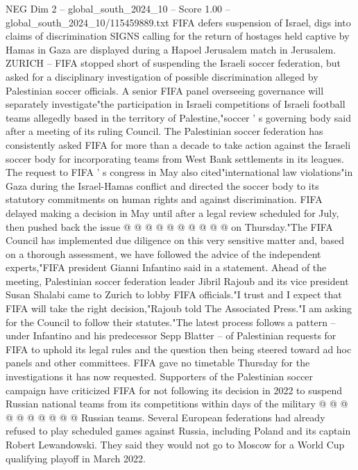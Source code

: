 \begin{textsample}{NEG Dim 2 – global\_south\_2024\_10 – Score 1.00 – global\_south\_2024\_10/115459889.txt}  \label{ex:f2_neg_418}
FIFA defers suspension of Israel, digs into claims of discrimination SIGNS calling for the return of hostages held captive by Hamas in Gaza are displayed during a Hapoel Jerusalem match in Jerusalem.
ZURICH -- FIFA stopped short of suspending the Israeli soccer federation, but asked for a disciplinary investigation of possible discrimination alleged by Palestinian soccer officials.
A senior FIFA panel overseeing governance will separately investigate"the participation in Israeli competitions of Israeli football teams allegedly based in the territory of Palestine,"soccer ' s governing body said after a meeting of its ruling Council.
The Palestinian soccer federation has consistently asked FIFA for more than a decade to take action against the Israeli soccer body for incorporating teams from West Bank settlements in its leagues.
The request to FIFA ' s congress in May also cited"international law violations"in Gaza during the Israel-Hamas conflict and directed the soccer body to its statutory commitments on human rights and against discrimination.
FIFA delayed making a decision in May until after a legal review scheduled for July, then pushed back the issue @ @ @ @ @ @ @ @ @ @ on Thursday."The FIFA Council has implemented due diligence on this very sensitive matter and, based on a thorough assessment, we have followed the advice of the independent experts,"FIFA president Gianni Infantino said in a statement.
Ahead of the meeting, Palestinian soccer federation leader Jibril Rajoub and its vice president Susan Shalabi came to Zurich to lobby FIFA officials."I trust and I expect that FIFA will take the right decision,"Rajoub told The Associated Press."I am asking for the Council to follow their statutes."The latest process follows a pattern -- under Infantino and his predecessor Sepp Blatter -- of Palestinian requests for FIFA to uphold its legal rules and the question then being steered toward ad hoc panels and other committees.
FIFA gave no timetable Thursday for the investigations it has now requested.
Supporters of the Palestinian soccer campaign have criticized FIFA for not following its decision in 2022 to suspend Russian national teams from its competitions within days of the military @ @ @ @ @ @ @ @ @ @ Russian teams.
Several European federations had already refused to play scheduled games against Russia, including Poland and its captain Robert Lewandowski.
They said they would not go to Moscow for a World Cup qualifying playoff in March 2022.

\end{textsample}
